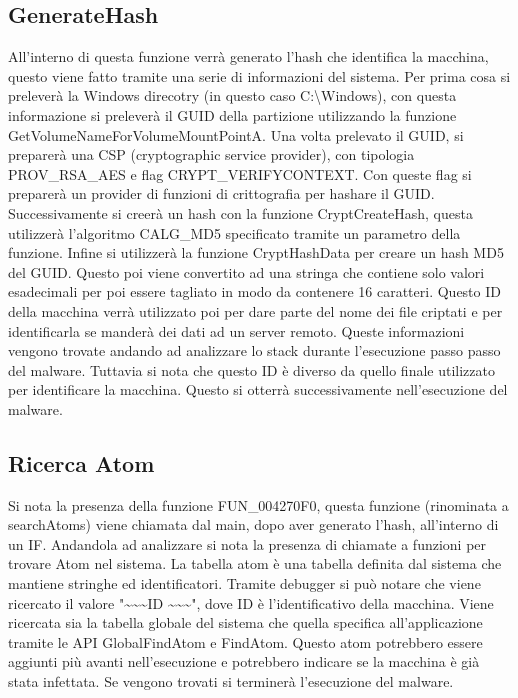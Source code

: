 \documentclass[a4paper,12pt]{article}
\begin{document}
\subsection{GenerateHash}
All'interno di questa funzione verrà generato l'hash che identifica la macchina, questo viene fatto tramite una serie di informazioni del sistema. Per prima cosa si preleverà la Windows direcotry (in questo caso C:\textbackslash Windows), con questa informazione si preleverà il GUID della partizione utilizzando la funzione GetVolumeNameForVolumeMountPointA. Una volta prelevato il GUID, si preparerà una CSP (cryptographic service provider), con tipologia PROV\_RSA\_AES e flag CRYPT\_VERIFYCONTEXT. Con queste flag si preparerà un provider di funzioni di crittografia per hashare il GUID. Successivamente si creerà un hash con la funzione CryptCreateHash, questa utilizzerà l'algoritmo CALG\_MD5 specificato tramite un parametro della funzione. Infine si utilizzerà la funzione CryptHashData per creare un hash MD5 del GUID. Questo poi viene convertito ad una stringa che contiene solo valori esadecimali per poi essere tagliato in modo da contenere 16 caratteri. Questo ID della macchina verrà utilizzato poi per dare parte del nome dei file criptati e per identificarla se manderà dei dati ad un server remoto. Queste informazioni vengono trovate andando ad analizzare lo stack durante l'esecuzione passo passo del malware. Tuttavia si nota che questo ID è diverso da quello finale utilizzato per identificare la macchina. Questo si otterrà successivamente nell'esecuzione del malware.

\subsection{Ricerca Atom}
Si nota la presenza della funzione FUN\_004270F0, questa funzione (rinominata a searchAtoms) viene chiamata dal main, dopo aver generato l'hash, all'interno di un IF. Andandola ad analizzare si nota la presenza di chiamate a funzioni per trovare Atom nel sistema. La tabella atom è una tabella definita dal sistema che mantiene stringhe ed identificatori. Tramite debugger si può notare che viene ricercato il valore "\textasciitilde\textasciitilde\textasciitilde ID \textasciitilde\textasciitilde\textasciitilde", dove ID è l'identificativo della macchina. Viene ricercata sia la tabella globale del sistema che quella specifica all'applicazione tramite le API GlobalFindAtom e FindAtom. 
Questo atom potrebbero essere aggiunti più avanti nell'esecuzione e potrebbero indicare se la macchina è già stata infettata. Se vengono trovati si terminerà l'esecuzione del malware. 
\end{document}

